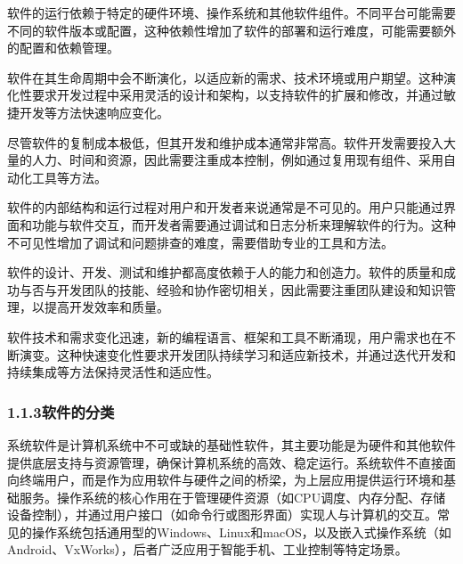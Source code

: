软件的运行依赖于特定的硬件环境、操作系统和其他软件组件。不同平台可能需要不同的软件版本或配置，这种依赖性增加了软件的部署和运行难度，可能需要额外的配置和依赖管理。


软件在其生命周期中会不断演化，以适应新的需求、技术环境或用户期望。这种演化性要求开发过程中采用灵活的设计和架构，以支持软件的扩展和修改，并通过敏捷开发等方法快速响应变化。


尽管软件的复制成本极低，但其开发和维护成本通常非常高。软件开发需要投入大量的人力、时间和资源，因此需要注重成本控制，例如通过复用现有组件、采用自动化工具等方法。


软件的内部结构和运行过程对用户和开发者来说通常是不可见的。用户只能通过界面和功能与软件交互，而开发者需要通过调试和日志分析来理解软件的行为。这种不可见性增加了调试和问题排查的难度，需要借助专业的工具和方法。


软件的设计、开发、测试和维护都高度依赖于人的能力和创造力。软件的质量和成功与否与开发团队的技能、经验和协作密切相关，因此需要注重团队建设和知识管理，以提高开发效率和质量。


软件技术和需求变化迅速，新的编程语言、框架和工具不断涌现，用户需求也在不断演变。这种快速变化性要求开发团队持续学习和适应新技术，并通过迭代开发和持续集成等方法保持灵活性和适应性。

\hypertarget{ux8f6fux4ef6ux7684ux5206ux7c7b}{%
\subsubsection{1.1.3软件的分类}\label{ux8f6fux4ef6ux7684ux5206ux7c7b}}


系统软件是计算机系统中不可或缺的基础性软件，其主要功能是为硬件和其他软件提供底层支持与资源管理，确保计算机系统的高效、稳定运行。系统软件不直接面向终端用户，而是作为应用软件与硬件之间的桥梁，为上层应用提供运行环境和基础服务。操作系统的核心作用在于管理硬件资源（如CPU调度、内存分配、存储设备控制），并通过用户接口（如命令行或图形界面）实现人与计算机的交互。常见的操作系统包括通用型的Windows、Linux和macOS，以及嵌入式操作系统（如Android、VxWorks），后者广泛应用于智能手机、工业控制等特定场景。

